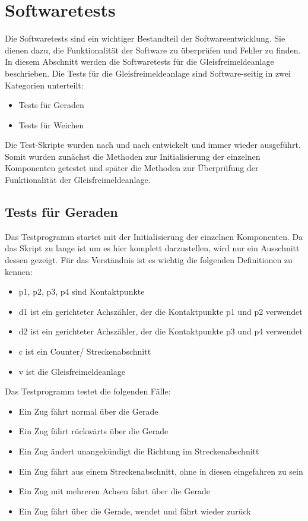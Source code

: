 \section{Softwaretests}\label{text:Entwicklung-der-GFA:Softwaretests}

Die Softwaretests sind ein wichtiger Bestandteil der Softwareentwicklung. Sie dienen dazu, die Funktionalität der Software zu überprüfen und Fehler zu finden. In diesem Abschnitt werden die Softwaretests für die Gleisfreimeldeanlage beschrieben.\newline
Die Tests für die Gleisfreimeldeanlage sind Software-seitig in zwei Kategorien unterteilt:
\begin{itemize}
    \item Tests für Geraden
    \item Tests für Weichen
\end{itemize}
Die Test-Skripte wurden nach und nach entwickelt und immer wieder ausgeführt. Somit wurden zunächst die Methoden zur Initialisierung der einzelnen Komponenten getestet und später die Methoden zur Überprüfung der Funktionalität der Gleisfreimeldeanlage.

\subsection{Tests für Geraden}\label{text:Entwicklung-der-GFA:Softwaretests:Tests-für-Geraden}

Das Testprogramm startet mit der Initialisierung der einzelnen Komponenten. Da das Skript zu lange ist um es hier komplett darzustellen, wird nur ein Ausschnitt dessen gezeigt. Für das Verständnis ist es wichtig die folgenden Definitionen zu kennen:
\begin{itemize}
    \item p1, p2, p3, p4 sind Kontaktpunkte
    \item d1 ist ein gerichteter Achszähler, der die Kontaktpunkte p1 und p2 verwendet
    \item d2 ist ein gerichteter Achszähler, der die Kontaktpunkte p3 und p4 verwendet
    \item c ist ein Counter/ Streckenabschnitt
    \item v ist die Gleisfreimeldeanlage
\end{itemize}

Das Testprogramm testet die folgenden Fälle:
\begin{itemize}
    \item Ein Zug fährt normal über die Gerade 
    \item Ein Zug fährt rückwärts über die Gerade
    \item Ein Zug ändert unangekündigt die Richtung im Streckenabschnitt
    \item Ein Zug fährt aus einem Streckenabschnitt, ohne in diesen eingefahren zu sein
    \item Ein Zug mit mehreren Achsen fährt über die Gerade
    \item Ein Zug fährt über die Gerade, wendet und fährt wieder zurück
\end{itemize}

